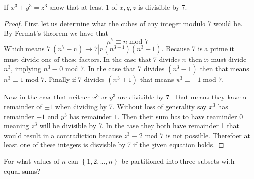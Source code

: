 \documentclass[11pt]{article}
\newenvironment{problem}[2][Problem\!]{\begin{trivlist}
\item[\hskip \labelsep {\bfseries #1}\hskip \labelsep {\bfseries #2}]}{\end{trivlist}}
\newcommand{\set}[1]{\left\{#1\right\}} %
\begin{document}
\begin{tcolorbox}
  \begin{problem} {IC | 11/10 | 136.} If $x^{3} + y^{3} = z^{3}$ show that at least 1 of $x,y,z$ is divisible by $7$.    
  \end{problem}
\end{tcolorbox}
\begin{proof}
  First let us determine what the cubes of any integer modulo 7 would be. By Fermat's theorem we have that \[n^{7} \equiv n \text{ mod }7\]
  Which means $7| (n^{7}-n) \rightarrow 7|n(n^{3-1})(n^{3} + 1)$. Because 7 is a prime it must divide one of these factors. In the case that 7 divides $n$ then it must divide $n^{3}$, implying $n^{3} \equiv 0 \text{ mod }7$. In the case that 7 divides $(n^{3}-1)$ then that means $n^{3} \equiv 1 \text{ mod }7 $. Finally if 7 divides $(n^{3} + 1)$ that means $n^{3} \equiv -1 \text{ mod }7$. 

  Now in the case that neither $x^{3}$ or $y^{3}$ are divisible by 7. That means they have a remainder of $\pm 1$ when dividing by 7. Without loss of generality say $x^{3}$ has remainder $-1$ and $y^{3}$ has remainder $1$. Then their sum has to have reaminder 0 meaning $z^{3}$ will be divisible by 7. In the case they both have remainder 1 that would result in a contradiction because $z^{3} \equiv 2 \text{ mod }7$ is not possible. Therefoer at least one of these integers is disvisble by 7 if the given equation holds. 
\end{proof}
\newpage
\begin{tcolorbox}
  \begin{problem} {IC | 11/10 | 139.}
    For what values of $n$ can $\set{1,2,\dots,n}$ be partitioned into three subsets with equal sums? 
  \end{problem}
\end{tcolorbox}
\end{document}
